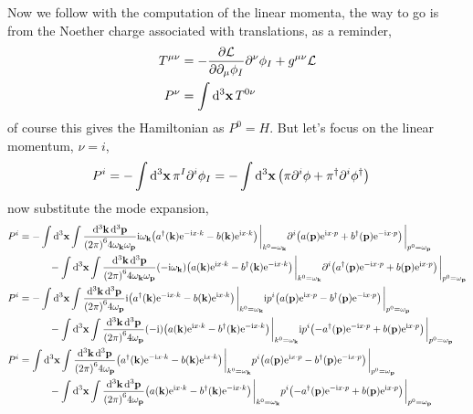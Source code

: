 Now we follow with the computation of the linear momenta, the way to go is from the Noether charge associated with translations, as a reminder,
\begin{align}
    \tensor{T}{^\mu^\nu}&=-\pdv{\mathcal L}{\partial_\mu\phi_I}\partial^\nu\phi_I+g^{\mu\nu}\mathcal L\\
    P^\nu&= \int\dd[3]{\vb x}T^{0\nu}
\end{align}
of course this gives the Hamiltonian as $P^0=H$. But let's focus on the linear momentum, $\nu=i$,
\begin{align}
    P^i&= -\int\dd[3]{\vb x}\pi^I\partial^i\phi_I =  -\int\dd[3]{\vb x}\qty(\pi\partial^i\phi+\pi^\dagger\partial^i\phi^\dagger)
\end{align}
now substitute the mode expansion,
\begin{align}
    P^i&=-\int\dd[3]{\vb x}\int\frac{\dd[3]{\vb k}\dd[3]{\vb p}}{\qty(2\pi)^64\omega_{\vb k}\omega_{\vb p}}\im\omega_{\vb k}\qty(a^\dagger\qty(\vb k)\e^{-\im x\cdot k}-b\qty(\vb k)\e^{\im x\cdot k})\eval_{k^0=\omega_{\vb k}}\partial^i\qty(a\qty(\vb p)\e^{\im x\cdot p}+b^\dagger\qty(\vb p)\e^{-\im x\cdot p})\eval_{p^0=\omega_{\vb p}}\nonumber\\
    &\quad\quad\quad-\int\dd[3]{\vb x}\int\frac{\dd[3]{\vb k}\dd[3]{\vb p}}{\qty(2\pi)^64\omega_{\vb k}\omega_{\vb p}}\qty(-\im\omega_{\vb k})\qty(a\qty(\vb k)\e^{\im x\cdot k}-b^\dagger\qty(\vb k)\e^{-\im x\cdot k})\eval_{k^0=\omega_{\vb k}}\partial^i\qty(a^\dagger\qty(\vb p)\e^{-\im x\cdot p}+b\qty(\vb p)\e^{\im x\cdot p})\eval_{p^0=\omega_{\vb p}}\\
    P^i&=-\int\dd[3]{\vb x}\int\frac{\dd[3]{\vb k}\dd[3]{\vb p}}{\qty(2\pi)^64\omega_{\vb p}}\im\qty(a^\dagger\qty(\vb k)\e^{-\im x\cdot k}-b\qty(\vb k)\e^{\im x\cdot k})\eval_{k^0=\omega_{\vb k}}\im p^i\qty(a\qty(\vb p)\e^{\im x\cdot p}-b^\dagger\qty(\vb p)\e^{-\im x\cdot p})\eval_{p^0=\omega_{\vb p}}\nonumber\\
    &\quad\quad\quad-\int\dd[3]{\vb x}\int\frac{\dd[3]{\vb k}\dd[3]{\vb p}}{\qty(2\pi)^64\omega_{\vb p}}\qty(-\im)\qty(a\qty(\vb k)\e^{\im x\cdot k}-b^\dagger\qty(\vb k)\e^{-\im x\cdot k})\eval_{k^0=\omega_{\vb k}}\im p^i\qty(-a^\dagger\qty(\vb p)\e^{-\im x\cdot p}+b\qty(\vb p)\e^{\im x\cdot p})\eval_{p^0=\omega_{\vb p}}\\
    P^i&=\int\dd[3]{\vb x}\int\frac{\dd[3]{\vb k}\dd[3]{\vb p}}{\qty(2\pi)^64\omega_{\vb p}}\qty(a^\dagger\qty(\vb k)\e^{-\im x\cdot k}-b\qty(\vb k)\e^{\im x\cdot k})\eval_{k^0=\omega_{\vb k}} p^i\qty(a\qty(\vb p)\e^{\im x\cdot p}-b^\dagger\qty(\vb p)\e^{-\im x\cdot p})\eval_{p^0=\omega_{\vb p}}\nonumber\\
    &\quad\quad\quad-\int\dd[3]{\vb x}\int\frac{\dd[3]{\vb k}\dd[3]{\vb p}}{\qty(2\pi)^64\omega_{\vb p}}\qty(a\qty(\vb k)\e^{\im x\cdot k}-b^\dagger\qty(\vb k)\e^{-\im x\cdot k})\eval_{k^0=\omega_{\vb k}} p^i\qty(-a^\dagger\qty(\vb p)\e^{-\im x\cdot p}+b\qty(\vb p)\e^{\im x\cdot p})\eval_{p^0=\omega_{\vb p}}
\end{align}
